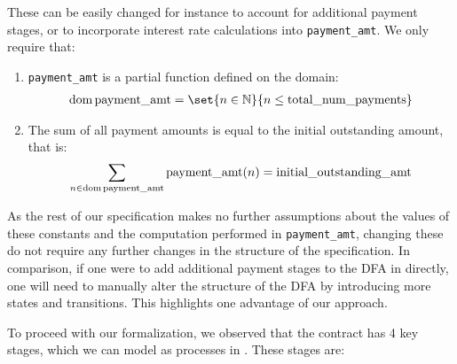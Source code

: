 \documentclass{article}
\begin{document}
These can be easily changed for instance to
account for additional payment stages, or to incorporate interest rate
calculations into \texttt{payment\_amt}.
We only require that:

\begin{enumerate}
  \item
  \texttt{payment\_amt} is a partial function defined on the domain:
  \begin{align*}
    \dom \text{payment\_amt} = \set{n \in \N}{n \leq \text{total\_num\_payments}}
  \end{align*}

  \item
  The sum of all payment amounts is equal to the initial outstanding amount,
  that is:
  \begin{align*}
    \sum_{n \in \operatorname{dom} \text{payment\_amt}}
      \text{payment\_amt}(n) = \text{initial\_outstanding\_amt}
  \end{align*}
\end{enumerate}

As the rest of our specification makes no further assumptions about the values
of these constants and the computation performed in \texttt{payment\_amt},
changing these do not require any further changes in the structure of the 
specification.
In comparison, if one were to add additional payment stages to the DFA in
\cite{contract_as_automaton} directly, one will need to manually alter the
structure of the DFA by introducing more states and transitions.
This highlights one advantage of our approach.

To proceed with our formalization, we observed that the contract has 4 key
stages, which we can model as processes in \mcrl.
These stages are:
\end{document}

